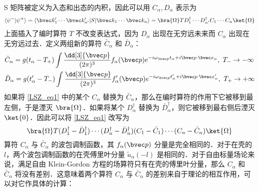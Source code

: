 

S 矩阵被定义为入态和出态的内积，因此可以用 $C_\alpha,D_\alpha$ 表示为
\begin{equation}\label{LSZ_eq1} \begin{aligned}
\langle\psi^-|\psi^+\rangle=\langle\bvec k'_1 \cdots \bvec k'_{n'}|S|\bvec k_1\cdots\bvec k_n\rangle=\bra{\Omega} T D_1^\dagger \cdots D_{n'}^\dagger C_1\cdots C_n \ket{\Omega}
\end{aligned}\end{equation} 
上面插入了编时算符 $T$ 不改变表达式，因为 $D_\alpha$ 出现在无穷远未来而 $C_\alpha$ 出现在无穷远过去．定义两组新的算符 $\bar C_\alpha$ 和 $\bar D_\alpha$：
\begin{equation} \begin{aligned}
&\bar C_\alpha=g(t_\alpha-T_+)\int \frac{\dd[3]{\bvec p}}{(2\pi)^3} f_\alpha(\bvec p)e^{-i\omega_{\bvec p}t_\alpha+i\bvec p\cdot \bvec x_\alpha},\ T_-\rightarrow -\infty\\
&\bar D_\alpha=g(t'_\alpha-T_-)\int \frac{\dd[3]{\bvec p}}{(2\pi)^3} f'_\alpha(\bvec p)e^{-i\omega_{\bvec p}t'_\alpha+i\bvec p\cdot \bvec x'_\alpha},\ T_+\rightarrow +\infty
\end{aligned}\end{equation}
如果将 \autoref{LSZ_eq1}  中的某个 $C_\alpha$ 替换为 $\bar{C}_\alpha$，那么在编时算符的作用下它被移到最左侧，于是湮灭 $\bra{\Omega}$．如果将某个 $D_\alpha^\dagger$ 替换为 $\bar{D}_\alpha^\dagger$，则它被移到最右侧后湮灭 $\ket{0}$．因此可以将 \autoref{LSZ_eq1}  改写为
\[
\bra{\Omega} T (D_1^\dagger-\bar{D}_1^\dagger) \cdots (D_n^\dagger-\bar{D}_n^\dagger) (C_1-\bar{C}_1)\cdots (C_n-\bar{C}_n) \ket{\Omega}
\]
算符 $C_\alpha$ 与 $\bar{C}_\alpha$ 的波包调制函数，其 $f_\alpha(\bvec p)$ 分量是完全相同的．对于在壳的 $l$，两个波包调制函数的在壳傅里叶分量 $\tilde{u}_\alpha(-l)$ 是相同的．对于自由标量场论来说，满足自由 Klein-Gordon 方程的场算符只有在壳的傅里叶分量，那么 $C_\alpha$ 和 $\bar{C}_\alpha$ 将没有差别．这意味着两个算符 $C_\alpha$ 与 $\bar{C}_\alpha$ 的差别来自于理论的相互作用，可以对它作具体的计算：
